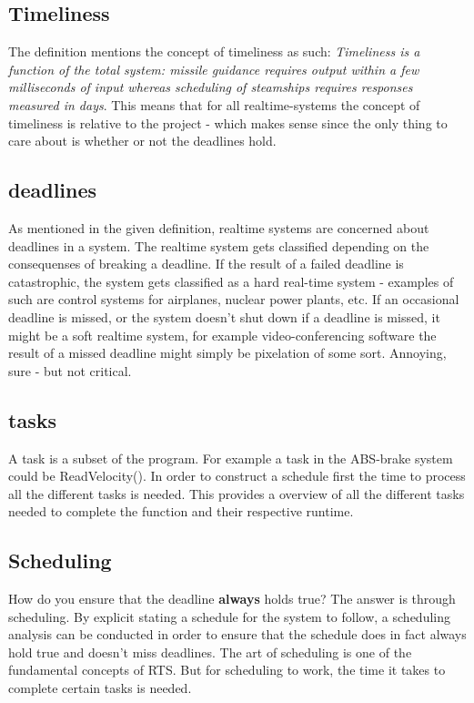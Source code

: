 \subsection{Timeliness}
The definition mentions the concept of timeliness as such: \textit{Timeliness
is a function of the total system: missile guidance requires output within a
few milliseconds of input whereas scheduling of steamships requires responses measured in days}. This means that for all realtime-systems the
concept of timeliness is relative to the project - which makes sense since the only thing to care about is whether or not the deadlines hold.
\subsection{deadlines}
As mentioned in the given definition, realtime systems are concerned about deadlines in a system.
The realtime system gets classified depending on the consequenses of breaking a deadline. If the result of a failed deadline
is catastrophic, the system gets classified as a hard real-time system - examples of such are control systems for airplanes, nuclear power plants, etc.
If an occasional deadline is missed, or the system doesn't shut down if a deadline is missed, it might be a soft realtime system, for example video-conferencing software
the result of a missed deadline might simply be pixelation of some sort. Annoying, sure - but not critical.
\subsection{tasks}
A task is a subset of the program. For example a task in the ABS-brake system could be ReadVelocity(). In order to construct a schedule first
the time to process all the different tasks is needed. This provides a overview of all the different tasks needed to complete the function and their
respective runtime.
\subsection{Scheduling}
How do you ensure that the deadline \textbf{always} holds true? The answer is through scheduling. By explicit stating a schedule for the system to follow,
a scheduling analysis can be conducted in order to ensure that the schedule does in fact always hold true and doesn't miss deadlines. The art of scheduling
is one of the fundamental concepts of RTS. But for scheduling to work, the time it takes to complete certain tasks is needed.
